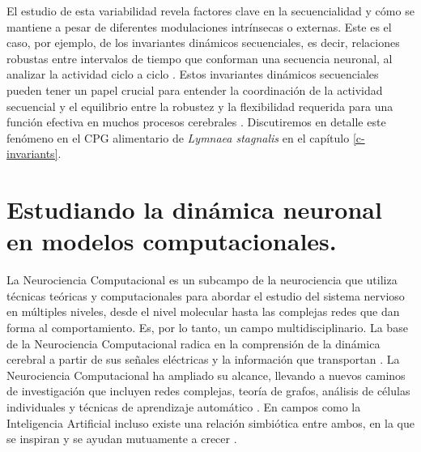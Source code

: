 El estudio de esta variabilidad revela factores clave en la secuencialidad y cómo se mantiene a pesar de diferentes modulaciones intrínsecas o externas. Este es el caso, por ejemplo, de los invariantes dinámicos secuenciales, es decir, relaciones robustas entre intervalos de tiempo que conforman una secuencia neuronal, al analizar la actividad ciclo a ciclo \parencite{reyes_artificial_2008,elices_robust_2019,garrido-pena_characterization_2021,berbel_emergence_2024}. Estos invariantes dinámicos secuenciales pueden tener un papel crucial para entender la coordinación de la actividad secuencial y el equilibrio entre la robustez y la flexibilidad requerida para una función efectiva en muchos procesos cerebrales \parencite{tatsuno_analysis_2015,ullen_neural_2003,zimnik_independent_2021,zhou_neural_2020,dragoi_cell_2020}. Discutiremos en detalle este fenómeno en el CPG alimentario de \textit{Lymnaea stagnalis} en el capítulo \ref{c-invariants}.\\


\section{Estudiando la dinámica neuronal en modelos computacionales.}
\label{sec:neurociencia_computacional}
La Neurociencia Computacional es un subcampo de la neurociencia que utiliza técnicas teóricas y computacionales para abordar el estudio del sistema nervioso en múltiples niveles, desde el nivel molecular hasta las complejas redes que dan forma al comportamiento. Es, por lo tanto, un campo multidisciplinario. La base de la Neurociencia Computacional radica en la comprensión de la dinámica cerebral a partir de sus señales eléctricas y la información que transportan \parencite{schwiening_brief_2012,catterall_hodgkinhuxley_2012,dimitrov_information_2011,shannon_mathematical_1948}. La Neurociencia Computacional ha ampliado su alcance, llevando a nuevos caminos de investigación que incluyen redes complejas, teoría de grafos, análisis de células individuales y técnicas de aprendizaje automático \parencite{cns2023}. En campos como la Inteligencia Artificial incluso existe una relación simbiótica entre ambos, en la que se inspiran y se ayudan mutuamente a crecer \parencite{amunts_human_2019,wozniak_deep_2020,goncalves_training_2020}.

